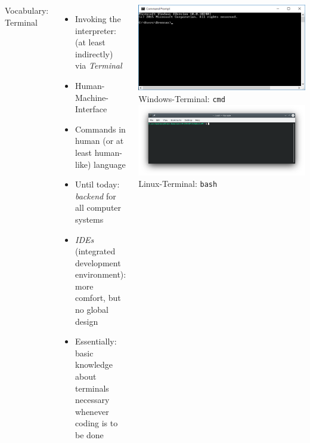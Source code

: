 \begin{frame}
%
\begin{columns}[T]
\begin{Large}
{Vocabulary: Terminal}
\end{Large}
\begin{itemize}
\item Invoking the interpreter: (at least indirectly) via \emph{Terminal}
\item Human-Machine-Interface
\item Commands in human (or at least human-like) language
\item Until today: \emph{backend} for all computer systems
\item \emph{IDEs} (integrated development environment): more comfort, but no global design
\item Essentially: basic knowledge about terminals necessary whenever coding is to be done
\end{itemize}
%
\includegraphics[width=\linewidth]{./gfx/cmd}
{\tiny Windows-Terminal: \texttt{cmd}}
\includegraphics[width=\linewidth]{./gfx/bash}
{\tiny Linux-Terminal: \texttt{bash}}
\end{columns}
%
\end{frame}


